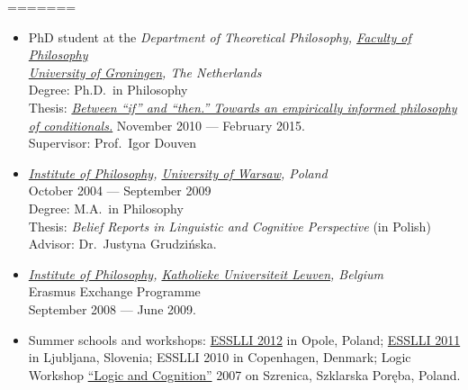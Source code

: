 \documentclass[11pt,article,oneside]{memoir}
\begin{document}

\bigskip
\bigskip
=======
  
  \begin{itemize}
    \item PhD student at
    the %
    \emph{Department of Theoretical Philosophy, \href{http://www.rug.nl/filosofie/}{Faculty of Philosophy}\\
    \href{http://www.rug.nl}{University of Groningen}, The Netherlands}\\
    Degree: Ph.D.\ in Philosophy\\
    Thesis: \emph{\href{http://karolinakrzyzanowska.com/pdfs/krzyzanowska-phd-final.pdf}{Between ``if'' and ``then.'' Towards an empirically informed philosophy of conditionals.}} 
    November 2010 --- February 2015.\\
    Supervisor: Prof.\ Igor Douven  
    
    \item \emph{\href{http://www.filozofia.uw.edu.pl}{Institute of Philosophy}, \href{http://www.uw.edu.pl}{University of Warsaw}, Poland}\\
    October 2004 --- September 2009\\
    Degree: M.A.\ in Philosophy\\
    Thesis: \emph{Belief Reports in Linguistic and Cognitive Perspective} (in Polish)\\
    Advisor: Dr.\ Justyna Grudzińska.
    
    \item \emph{\href{http://hiw.kuleuven.be/eng/}{Institute of Philosophy}, \href{http://www.kuleuven.be}{Katholieke Universiteit Leuven}, Belgium}\\
    Erasmus Exchange Programme\\
    September 2008 --- June 2009.
  

    \item Summer schools and workshops:
    \href{http://www.esslli2012.pl}{ESSLLI 2012} in Opole, Poland;
    \href{http://esslli2011.ijs.si}{ESSLLI 2011} in Ljubljana, Slovenia;
    ESSLLI 2010 in Copenhagen, Denmark;
    Logic Workshop \href{http://www.logika.uw.edu.pl/warsztaty2007/index.html}{``Logic
      and Cognition''} 2007 on Szrenica, Szklarska Poręba, Poland.


\end{itemize}
\end{document}
